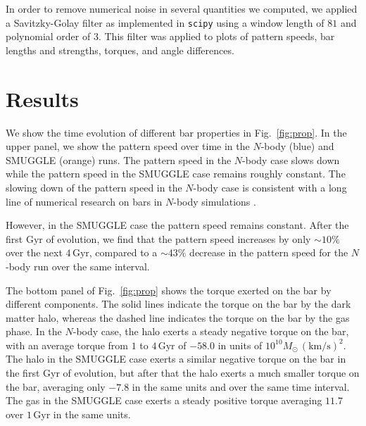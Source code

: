 \documentclass[fleqn,usenatbib]{mnras}
\newcommand{\Nbody}{$N$-body}
\begin{document}
In order to remove numerical noise in several quantities we computed, we
applied a Savitzky-Golay filter \citep{1964AnaCh..36.1627S} as implemented in
\texttt{scipy} using a window length of $81$ and polynomial order of $3$. This
filter was applied to plots of pattern speeds, bar lengths and strengths,
torques, and angle differences.

\section{Results}
\label{sec:results}

We show the time evolution of different bar properties in Fig.~\ref{fig:prop}.
In the upper panel, we show the pattern speed over time in the \Nbody{} (blue)
and SMUGGLE (orange) runs. The pattern speed in the \Nbody{} case slows down
while the pattern speed in the SMUGGLE case remains roughly constant. The
slowing down of the pattern speed in the \Nbody{} case is consistent with a long
line of numerical research on bars in \Nbody{} simulations
\citep{1992ApJ...400...80H, 2000ApJ...543..704D, 2002MNRAS.330...35A,
2002ApJ...569L..83A, 2003MNRAS.341.1179A, 2003MNRAS.346..251O,
2005MNRAS.363..991H, 2006ApJ...637..214M, 2007MNRAS.375..460W,
2009ApJ...697..293D}.

However, in the SMUGGLE case the pattern speed remains constant. After the first
Gyr of evolution, we find that the pattern speed increases by only $\sim10\%$
over the next $4\,\textrm{Gyr}$, compared to a $\sim43\%$ decrease in the
pattern speed for the \Nbody{} run over the same interval.

The bottom panel of Fig.~\ref{fig:prop} shows the torque exerted on the bar by
different components. The solid lines indicate the torque on the bar by the dark
matter halo, whereas the dashed line indicates the torque on the bar by the gas
phase. In the \Nbody{} case, the halo exerts a steady negative torque on the
bar, with an average torque from $1$ to $4\,\textrm{Gyr}$ of $-58.0$ in units of
$10^{10}M_{\odot}\,(\textrm{km}/\textrm{s})^2$. The halo in the SMUGGLE case
exerts a similar negative torque on the bar in the first Gyr of evolution, but
after that the halo exerts a much smaller torque on the bar, averaging only
$-7.8$ in the same units and over the same time interval. The gas in the SMUGGLE
case exerts a steady positive torque averaging $11.7$ over $1\,\textrm{Gyr}$ in
the same units.
\end{document}
